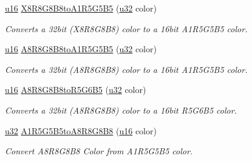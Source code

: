 \begin{DoxyCompactItemize}
\mbox{\label{namespaceirr_1_1video_a6824dfc9c71a7fd9d7a3e704b1267ddc}} 
\hyperlink{namespaceirr_ae9f8ec82692ad3b83c21f555bfa70bcc}{u16} \hyperlink{namespaceirr_1_1video_a6824dfc9c71a7fd9d7a3e704b1267ddc}{X8\+R8\+G8\+B8to\+A1\+R5\+G5\+B5} (\hyperlink{namespaceirr_a0416a53257075833e7002efd0a18e804}{u32} color)
\begin{DoxyCompactList}\small\item\em Converts a 32bit (X8\+R8\+G8\+B8) color to a 16bit A1\+R5\+G5\+B5 color. \end{DoxyCompactList}\item 
\mbox{\label{namespaceirr_1_1video_a929c6758a0edc772cf69b2c674e4f5cd}} 
\hyperlink{namespaceirr_ae9f8ec82692ad3b83c21f555bfa70bcc}{u16} \hyperlink{namespaceirr_1_1video_a929c6758a0edc772cf69b2c674e4f5cd}{A8\+R8\+G8\+B8to\+A1\+R5\+G5\+B5} (\hyperlink{namespaceirr_a0416a53257075833e7002efd0a18e804}{u32} color)
\begin{DoxyCompactList}\small\item\em Converts a 32bit (A8\+R8\+G8\+B8) color to a 16bit A1\+R5\+G5\+B5 color. \end{DoxyCompactList}\item 
\mbox{\label{namespaceirr_1_1video_a10636302b225d7f525fa46bbd3f747a4}} 
\hyperlink{namespaceirr_ae9f8ec82692ad3b83c21f555bfa70bcc}{u16} \hyperlink{namespaceirr_1_1video_a10636302b225d7f525fa46bbd3f747a4}{A8\+R8\+G8\+B8to\+R5\+G6\+B5} (\hyperlink{namespaceirr_a0416a53257075833e7002efd0a18e804}{u32} color)
\begin{DoxyCompactList}\small\item\em Converts a 32bit (A8\+R8\+G8\+B8) color to a 16bit R5\+G6\+B5 color. \end{DoxyCompactList}\item 
\hyperlink{namespaceirr_a0416a53257075833e7002efd0a18e804}{u32} \hyperlink{namespaceirr_1_1video_a8aa9e69faa25064379df5a91273b9fbe}{A1\+R5\+G5\+B5to\+A8\+R8\+G8\+B8} (\hyperlink{namespaceirr_ae9f8ec82692ad3b83c21f555bfa70bcc}{u16} color)
\begin{DoxyCompactList}\small\item\em Convert A8\+R8\+G8\+B8 Color from A1\+R5\+G5\+B5 color. \end{DoxyCompactList}\item 
\mbox{\label{namespaceirr_1_1video_a421971627afe81533a3c2b51907b72bd}} 

\end{DoxyCompactItemize}
